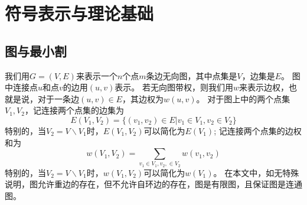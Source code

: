 \chapter{符号表示与理论基础}

\section{图与最小割}

我们用$G=(V,E)$来表示一个$n$个点$m$条边无向图，其中点集是$V$，边集是$E$。
图中连接点$u$和点$v$的边用$(u,v)$表示。
若无向图带权，则我们用$w$来表示边权，也就是说，对于一条边$(u,v)\in E$，其边权为$w(u,v)$。
对于图上中的两个点集$V_1,V_2$，记连接两个点集的边集为
\begin{equation*}
    E(V_1,V_2)=\{(v_1,v_2)\in E|v_1\in V_1,v_2\in V_2\}
\end{equation*}
特别的，当$V_2=V\backslash V_1$时，$E(V_1,V_2)$可以简化为$E(V_1)$;
记连接两个点集的边权和为
\begin{equation*}
    w(V_1,V_2)=\sum_{v_1\in V_1,v_2,\in V_2}w(v_1,v_2)
\end{equation*}
特别的，当$V_2=V\backslash V_1$时，$w(V_1,V_2)$可以简化为$w(V_1)$。
在本文中，如无特殊说明，图允许重边的存在，但不允许自环边的存在，图是有限图，且保证图是连通图。

